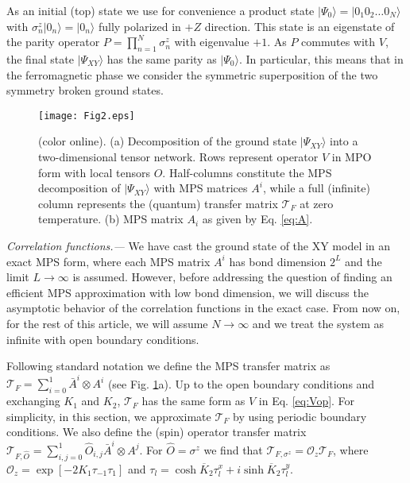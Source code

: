 \documentclass[prl,twocolumn,showpacs,floatfix,superscriptaddress,nofootinbib]{revtex4-1}
\newcommand{\Br}[1]{\left[#1\right]}
\begin{document}
As an initial (top) state we use for convenience a product state 
$\vert \Psi_0 \rangle = \vert 0_1 0_2 \dotsc 0_N \rangle$ 
with $\sigma^z_n |0_n\rangle = |0_n\rangle$ fully polarized in $+Z$ direction. 
This state is an eigenstate of the parity operator $P = \prod_{n=1}^N \sigma^z_n $ with eigenvalue $+1$. 
As $P$ commutes with $V$, the final state $\vert \Psi_{XY} \rangle$ has the same parity as $\vert \Psi_0 \rangle$. 
In particular, this means that in the ferromagnetic phase we consider the symmetric superposition of the two symmetry broken ground states.

\begin{figure}[t]
\begin{center}
\texttt{[image: Fig2.eps]}
\end{center}
\caption{(color online). (a) Decomposition of the ground state $|\Psi_{XY} \rangle$  into a two-dimensional tensor network. Rows represent operator $V$ in MPO form with local tensors $O$.
Half-columns constitute the MPS decomposition of $|\Psi_{XY} \rangle$ with MPS matrices $A^i$, while a full (infinite) column represents the (quantum) transfer matrix $\mathcal{T}_F$ at zero temperature. 
(b) MPS matrix $A_i$ as given by Eq. \eqref{eq:A}.}
 \label{fig:network}
\end{figure}


{\it Correlation functions.---} We have cast the ground state of the XY model in an exact MPS form, where each MPS matrix $A^i$ has bond dimension $2^L$ and the limit $L \rightarrow \infty$ is assumed. 
However, before addressing the question of finding an efficient MPS approximation with low bond dimension, we will discuss the asymptotic behavior of the correlation functions in the exact case.
From now on, for the rest of this article, we will assume $N\to\infty$ and we treat the system as infinite with open boundary conditions.

Following standard notation \cite{Verstraete2008,Schollwock2011} we define the MPS transfer matrix as $\mathcal{T}_F  = \sum_{i=0}^1 \bar{A}^{i} \otimes A^i$ (see Fig. \ref{fig:network}a). 
Up to the open boundary conditions and exchanging $K_1$  and $K_2$, $\mathcal{T}_F$ has the same form as $V$ in Eq. \eqref{eq:Vop}. 
For simplicity, in this section, we approximate $\mathcal{T}_F$ by using periodic boundary conditions.
We also define the (spin) operator transfer matrix 
$\mathcal{T}_{F,\hat O} = \sum_{i,j=0}^1 \hat O_{i,j} \bar{A}^{i} \otimes A^j$. 
For $\hat O = \sigma^z$ we find that $\mathcal{T}_{F,\sigma^{z}} = \mathcal{O}_{z} \mathcal{T}_F$, where $\mathcal{O}_z =  \exp \Br{-2 K_1 \tau_{-1} \tau_{1}}$ and $\tau_l = \cosh \overline K_2 \tau^x_l + i \sinh \overline K_2 \tau^y_l $.
\end{document}
